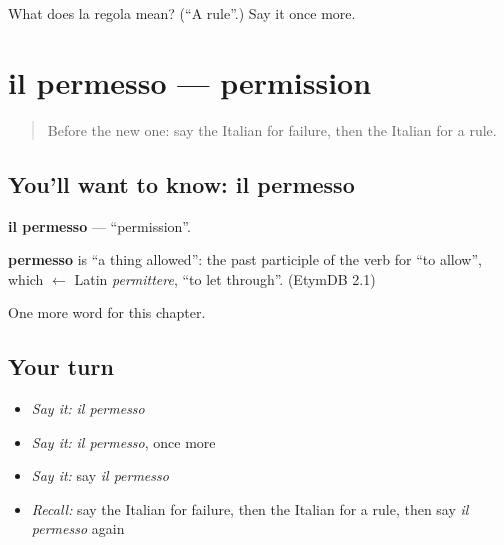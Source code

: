 \begin{tcolorbox}[breakable,colback=teal!4,colframe=teal!35!black,title={Before you move on}]
What does la regola mean? (\textquotedblleft{}A rule\textquotedblright{}.) Say it once more.
\end{tcolorbox}
\section[il permesso]{il permesso — permission}

\label{lesson:IT-C165-permesso}



\begin{quote}
Before the new one: say the Italian for failure, then the Italian for a rule.
\end{quote}

\subsection*{You'll want to know: il permesso}
\textbf{il permesso} — \textquotedblleft{}permission\textquotedblright{}.

\begin{cousinweb}
\textbf{permesso} is \textquotedblleft{}a thing allowed\textquotedblright{}: the past participle of the verb for \textquotedblleft{}to allow\textquotedblright{}, which $\leftarrow$ Latin \emph{permittere}, \textquotedblleft{}to let through\textquotedblright{}. (EtymDB 2.1)
\end{cousinweb}

\begin{grammarlens}[title={What you've built}]
One more word for this chapter.
\end{grammarlens}

\subsection*{Your turn}
\begin{itemize}
\raggedright
  \item \emph{Say it:} \emph{il permesso}
  \item \emph{Say it:} \emph{il permesso}, once more
  \item \emph{Say it:} say \emph{il permesso}
  \item \emph{Recall:} say the Italian for failure, then the Italian for a rule, then say \emph{il permesso} again
\end{itemize}

